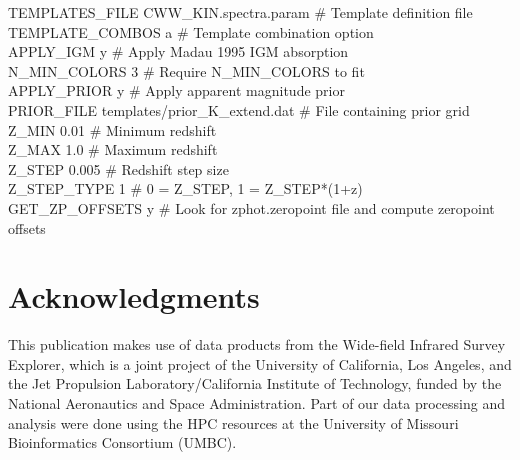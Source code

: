 \documentclass[apj,iop]{emulateapj}
\begin{document}
TEMPLATES\_FILE       CWW\_KIN.spectra.param \# Template definition file\\
TEMPLATE\_COMBOS      a                  \# Template combination option\\
APPLY\_IGM            y                  \# Apply Madau 1995 IGM absorption\\
N\_MIN\_COLORS         3                 \# Require N\_MIN\_COLORS to fit\\
APPLY\_PRIOR          y                  \# Apply apparent magnitude prior\\
PRIOR\_FILE           templates/prior\_K\_extend.dat \# File containing prior grid\\
Z\_MIN                0.01               \# Minimum redshift\\
Z\_MAX                1.0                \# Maximum redshift\\
Z\_STEP               0.005               \# Redshift step size\\
Z\_STEP\_TYPE          1                 \#  0 = Z\_STEP, 1 = Z\_STEP*(1+z)\\
GET\_ZP\_OFFSETS       y                 \# Look for zphot.zeropoint file and compute zeropoint offsets\\

\section{Acknowledgments}
This publication makes use of data products from the Wide-field Infrared Survey Explorer, which is a joint project of the University of California, Los Angeles, and the Jet Propulsion Laboratory/California Institute of Technology, funded by the National Aeronautics and Space Administration. Part of our data processing and analysis were done using the HPC resources at the University of Missouri Bioinformatics Consortium (UMBC).
\end{document}
